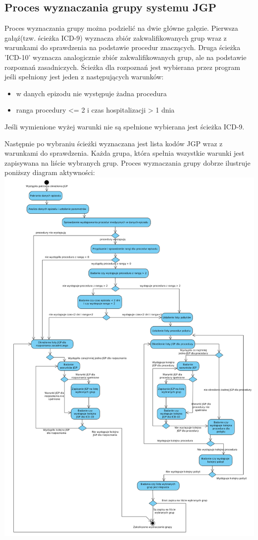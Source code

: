 \newpage
\subsection{Proces wyznaczania grupy systemu JGP}
\label{sec:procesWyznaczaniaGrupySystemuJGP}
Proces wyznaczania grupy można podzielić na dwie główne gałęzie. Pierwsza gałąź(tzw. ścieżka ICD-9) wyznacza zbiór zakwalifikowanych grup wraz z warunkami do sprawdzenia na podstawie procedur znaczących. Druga ścieżka 'ICD-10' wyznacza analogicznie zbiór zakwalifikowanych grup, ale na podstawie rozpoznań zasadniczych. Ścieżka dla rozpoznań jest wybierana przez program jeśli spełniony jest jeden z następujących warunków:
\begin{itemize}\itemsep2pt
\item w danych epizodu nie występuje żadna procedura
\item ranga procedury <= 2 i czas hospitalizacji > 1 dnia
\end{itemize}
Jeśli wymienione wyżej warunki nie są spełnione wybierana jest ścieżka ICD-9.

Następnie po wybraniu ścieżki wyznaczana jest lista kodów JGP wraz z warunkami do sprawdzenia. Każda grupa, która spełnia wszystkie warunki jest zapisywana na liście wybranych grup. Proces wyznaczania grupy dobrze ilustruje poniższy diagram aktywności:
\newpage
\includegraphics[scale=0.4]{images/activity-jgp} 

